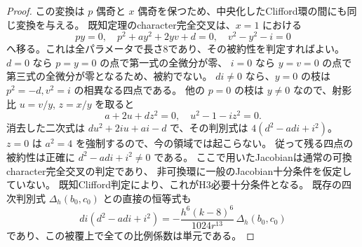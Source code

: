 \begin{proof}
この変換は $p$ 偶奇と $x$ 偶奇を保つため、中央化したClifford環の間にも同じ変換を与える。
既知定理のcharacter完全交叉は、$x=1$ における
\[
 py=0,\quad p^2+a y^2+2yv+d=0,\quad v^2-y^2-i=0
\]
へ移る。これは全パラメータで長さ8であり、その被約性を判定すればよい。
$d=0$ なら $p=y=0$ の点で第一式の全微分が零、
$i=0$ なら $y=v=0$ の点で第三式の全微分が零となるため、被約でない。
$di\ne0$ なら、$y=0$ の枝は $p^2=-d,v^2=i$ の相異なる四点である。
他の $p=0$ の枝は $y\ne0$ なので、射影比 $u=v/y$, $z=x/y$ を取ると
\[
 a+2u+dz^2=0,\quad u^2-1-iz^2=0.
\]
消去した二次式は $du^2+2iu+ai-d$ で、その判別式は
$4(d^2-adi+i^2)$。
$z=0$ は $a^2=4$ を強制するので、今の領域では起こらない。
従って残る四点の被約性は正確に $d^2-adi+i^2\ne0$ である。
ここで用いたJacobianは通常の可換character完全交叉の判定であり、
非可換環に一般のJacobian十分条件を仮定していない。
既知Clifford判定により、これがH3必要十分条件となる。
既存の四次判別式 $\Delta_h(b_0,c_0)$ との直接の恒等式も
\[
 di(d^2-adi+i^2)
 =-\frac{h^6(k-8)^6}{1024r^{13}}\,\Delta_h(b_0,c_0)
\]
であり、この被覆上で全ての比例係数は単元である。
\end{proof}


